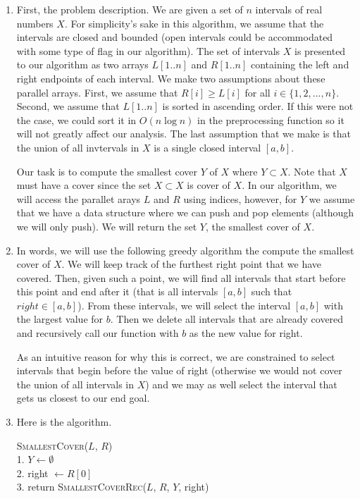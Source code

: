 \documentclass{article}
\begin{document}
\begin{enumerate}
    \item First, the problem description.
    We are given a set of $n$ intervals of real numbers $X$.
    For simplicity's sake in this algorithm, we assume that the intervals are closed and bounded (open intervals could be accommodated with some type of flag in our algorithm).
    The set of intervals $X$ is presented to our algorithm as two arrays $L[1..n]$ and $R[1..n]$ containing the left and right endpoints of each interval.
    We make two assumptions about these parallel arrays.
    First, we assume that $R[i] \geq L[i]$ for all $i \in \{ 1, 2, ..., n \}$.
    Second, we assume that $L[1..n]$ is sorted in ascending order.
    If this were not the case, we could sort it in $O(n \log n)$ in the preprocessing function so it will not greatly affect our analysis.
    The last assumption that we make is that the union of all invtervals in $X$ is a single closed interval $[a,b]$.

    Our task is to compute the smallest cover $Y$ of $X$ where $Y \subset X$.
    Note that $X$ must have a cover since the set $X \subset X$ is cover of $X$.
    In our algorithm, we will access the parallet arays $L$ and $R$ using indices, however, for $Y$ we assume that we have a data structure where we can push and pop elements (although we will only push).
    We will return the set $Y$, the smallest cover of $X$.
    \item In words, we will use the following greedy algorithm the compute the smallest cover of $X$.
    We will keep track of the furthest right point that we have covered.
    Then, given such a point, we will find all intervals that start before this point and end after it (that is all intervals $[a,b]$ such that $right \in [a,b]$).
    From these intervals, we will select the interval $[a,b]$ with the largest value for $b$.
    Then we delete all intervals that are already covered and recursively call our function with $b$ as the new value for right.

    As an intuitive reason for why this is correct, we are constrained to select intervals that begin before the value of right (otherwise we would not cover the union of all intervals in $X$) and we may as well select the interval that gets us closest to our end goal.
    \item Here is the algorithm.
    \begin{algorithm}
        \textsc{SmallestCover}($L$, $R$) \\
        1. \hspace{1em} $Y \gets \emptyset$ \\
        2. \hspace{1em} right $\gets R[0]$ \\
        3. \hspace{1em} return \textsc{SmallestCoverRec}($L$, $R$, $Y$, right) \\


\end{algorithm}
\end{enumerate}
\end{document}
